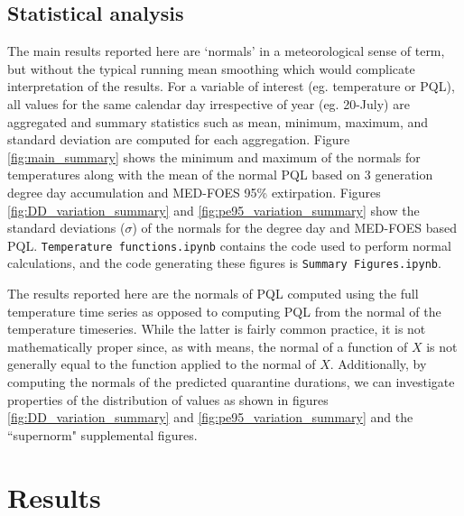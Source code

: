 \documentclass[10pt,a4paper,twocolumn]{article}
\begin{document}
\subsection*{Statistical analysis}

The main results reported here are `normals' in a meteorological sense of term,
but without the typical running mean smoothing which would complicate
interpretation of the results.
For a variable of interest (eg. temperature or PQL), 
all values for the same calendar day irrespective of year (eg. 20-July) are
aggregated and summary statistics such as mean, minimum, maximum, and standard deviation 
are computed for each aggregation.
Figure \ref{fig:main_summary} shows the minimum and maximum of the normals for temperatures
along with the mean of the normal PQL based on 3 generation degree day accumulation 
and MED-FOES 95\% extirpation.
Figures \ref{fig:DD_variation_summary} and \ref{fig:pe95_variation_summary} show the 
standard deviations ($\sigma$) of the normals for the degree day and MED-FOES based PQL.
\texttt{Temperature functions.ipynb} contains the code used to perform normal calculations, 
and the code generating these figures is \texttt{Summary Figures.ipynb}.

The results reported here are the normals of PQL computed using the full temperature time series
as opposed to computing PQL from the normal of the temperature timeseries.
While the latter is fairly common practice, it is not mathematically proper 
since, as with means, the normal of a function of $X$ is not generally equal to the function applied to the normal of $X$.
Additionally, by computing the normals of the predicted quarantine durations, 
we can investigate properties of the distribution of values as shown in 
figures \ref{fig:DD_variation_summary} and \ref{fig:pe95_variation_summary} and the ``supernorm" supplemental figures.


\section*{Results}
\end{document}
